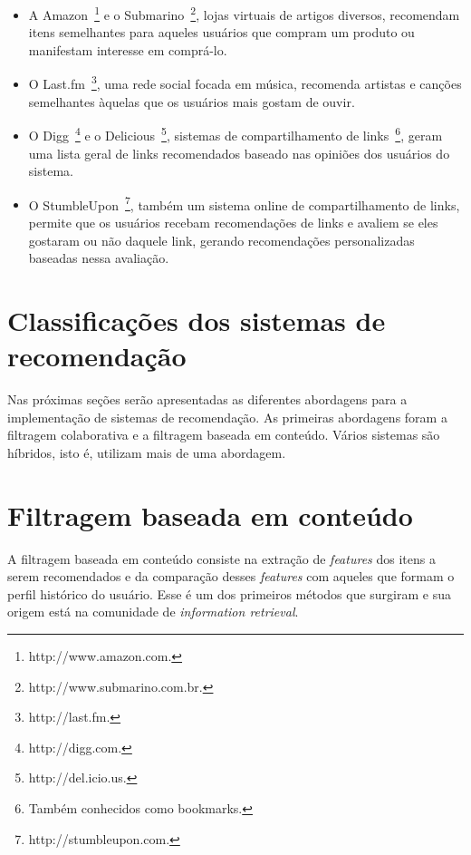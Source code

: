 \begin{itemize}
\item 
A Amazon~\footnote{http://www.amazon.com.} e o Submarino~\footnote{http://www.submarino.com.br.}, lojas virtuais de artigos diversos, recomendam itens semelhantes para aqueles usuários que compram um produto ou manifestam interesse em comprá-lo.

\item O Last.fm~\footnote{http://last.fm.}, uma rede social focada em música, recomenda artistas e canções semelhantes àquelas que os usuários mais gostam de ouvir.

\item O Digg~\footnote{http://digg.com.} e o Delicious~\footnote{http://del.icio.us.}, sistemas de compartilhamento de links~\footnote{Também conhecidos como bookmarks.}, geram uma lista geral de links recomendados baseado nas opiniões dos usuários do sistema.

\item O StumbleUpon~\footnote{http://stumbleupon.com.}, também um sistema online de compartilhamento de links, permite que os usuários recebam recomendações de links e avaliem se eles gostaram ou não daquele link, gerando recomendações personalizadas baseadas nessa avaliação.
\end{itemize}


\section{Classificações dos sistemas de recomendação}

Nas próximas seções serão apresentadas as diferentes abordagens para a implementação de sistemas de recomendação. As primeiras abordagens foram a filtragem colaborativa e a filtragem baseada em conteúdo. Vários sistemas são híbridos, isto é, utilizam mais de uma abordagem.


\section{Filtragem baseada em conteúdo} %
A filtragem baseada em conteúdo consiste na extração de \textit{features} dos itens a serem recomendados e da comparação desses \textit{features} com aqueles que formam o  perfil histórico do usuário. Esse é um dos primeiros métodos que surgiram e sua origem está na comunidade de \textit{information retrieval}.~\cite{Balabanovi97}

